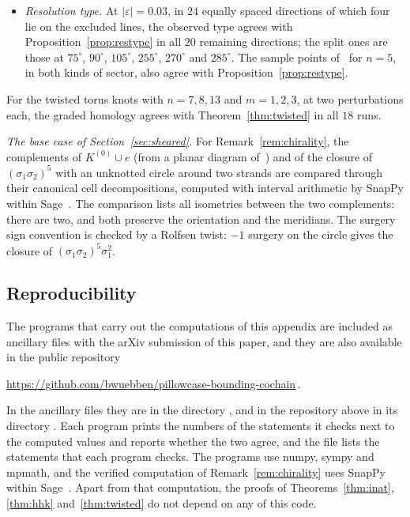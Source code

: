 \begin{enumerate}
\begin{itemize}
 $|\varepsilon|\le0.031$, and $q=7,9,\dots,21$, all $40$ cases agree: the arc is $\varphi$-monotone with $q-2$
 generators, and the remnant circle has homology of rank $1$ in each degree. The circle carries $4+4N_q$
 generators in $37$ cases; in the other three ($q=17$, at the three larger perturbations) a canceling pair is
 missing. A lift of $L_0$ meets the lift of the circle up to seven times ($q=21$).
 \item \emph{Resolution type.} At $|\varepsilon|=0.03$, in $24$ equally spaced directions of which four lie on
 the excluded lines, the observed type agrees with Proposition~\ref{prop:restype} in all $20$ remaining
 directions; the split ones are those at $75^\circ$, $90^\circ$, $105^\circ$, $255^\circ$, $270^\circ$ and
 $285^\circ$. The sample points of~\cite[Rem.~5.8]{WuebbenV} for $n=5$, in both kinds of sector, also agree with
 Proposition~\ref{prop:restype}.
 \end{itemize}
 For the twisted torus
 knots with $n=7,8,13$ and $m=1,2,3$, at two perturbations each, the graded homology agrees with
 Theorem~\ref{thm:twisted} in all $18$ runs.
\end{enumerate}

\emph{The base case of Section~\ref{sec:sheared}.}  For Remark~\ref{rem:chirality}, the complements of $K^{(0)}\cup e$ (from a
planar diagram of~\cite[Fig.~18]{HHK2}) and of the closure of $(\sigma_1\sigma_2)^5$ with an unknotted circle around two
strands are compared through their canonical cell decompositions, computed with interval arithmetic by SnapPy within
Sage~\cite{SnapPy,HIKMOT,DHL}.  The comparison lists all isometries between the two complements: there are two, and both
preserve the orientation and the meridians.  The surgery sign convention is checked by a Rolfsen twist: $-1$ surgery
on the circle gives the closure of $(\sigma_1\sigma_2)^5\sigma_1^2$.

\subsection{Reproducibility}\label{ss:repro}
The programs that carry out the computations of this appendix are included as ancillary files with the arXiv
submission of this paper, and they are also available in the public repository
\begin{center}
\url{https://github.com/bwuebben/pillowcase-bounding-cochain}\,.
\end{center}
In the ancillary files they are in the directory , and in the repository above in its directory
.
Each program prints the numbers of the statements it checks next to the computed values and reports whether
the two agree, and the file  lists the statements that each program checks. The programs use numpy,
sympy and mpmath, and the verified computation of Remark~\ref{rem:chirality} uses SnapPy within Sage~\cite{SnapPy}.
Apart from that computation, the proofs of Theorems~\ref{thm:inat}, \ref{thm:hhk} and~\ref{thm:twisted} do not depend
on any of this code.
